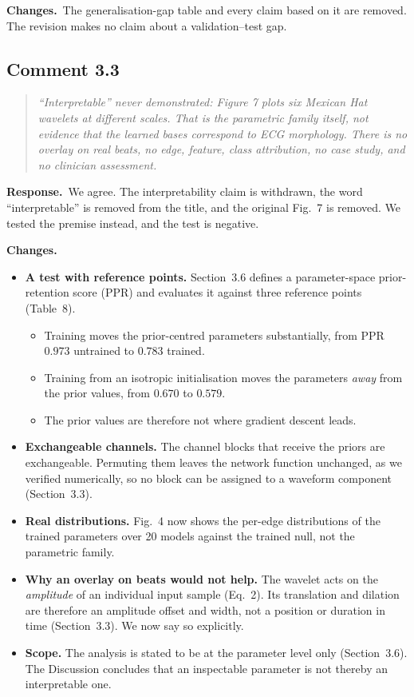 \documentclass[11pt]{article}
\newenvironment{reviewer}{\begin{quote}\itshape\color{revcol}}{\end{quote}}
\newcommand{\resp}{\textbf{Response.}~}
\newcommand{\chg}{\textbf{Changes.}~}
\begin{document}
\chg The generalisation-gap table and every claim based on it are removed. The revision makes no claim about a validation--test gap.

\subsection*{Comment 3.3}
\begin{reviewer}
``Interpretable'' never demonstrated: Figure 7 plots six Mexican Hat wavelets at different scales. That is the parametric family itself, not evidence that the learned bases correspond to ECG morphology. There is no overlay on real beats, no edge, feature, class attribution, no case study, and no clinician assessment.
\end{reviewer}
\resp We agree. The interpretability claim is withdrawn, the word ``interpretable'' is removed from the title, and the original Fig.~7 is removed. We tested the premise instead, and the test is negative.

\chg
\begin{itemize}[leftmargin=1.2em,itemsep=2pt]
\item \textbf{A test with reference points.} Section~3.6 defines a parameter-space prior-retention score (PPR) and evaluates it against three reference points (Table~8).
  \begin{itemize}[itemsep=0pt]
  \item Training moves the prior-centred parameters substantially, from PPR $0.973$ untrained to $0.783$ trained.
  \item Training from an isotropic initialisation moves the parameters \emph{away} from the prior values, from $0.670$ to $0.579$.
  \item The prior values are therefore not where gradient descent leads.
  \end{itemize}
\item \textbf{Exchangeable channels.} The channel blocks that receive the priors are exchangeable. Permuting them leaves the network function unchanged, as we verified numerically, so no block can be assigned to a waveform component (Section~3.3).
\item \textbf{Real distributions.} Fig.~4 now shows the per-edge distributions of the trained parameters over 20 models against the trained null, not the parametric family.
\item \textbf{Why an overlay on beats would not help.} The wavelet acts on the \emph{amplitude} of an individual input sample (Eq.~2). Its translation and dilation are therefore an amplitude offset and width, not a position or duration in time (Section~3.3). We now say so explicitly.
\item \textbf{Scope.} The analysis is stated to be at the parameter level only (Section~3.6). The Discussion concludes that an inspectable parameter is not thereby an interpretable one.
\end{itemize}
\end{document}
